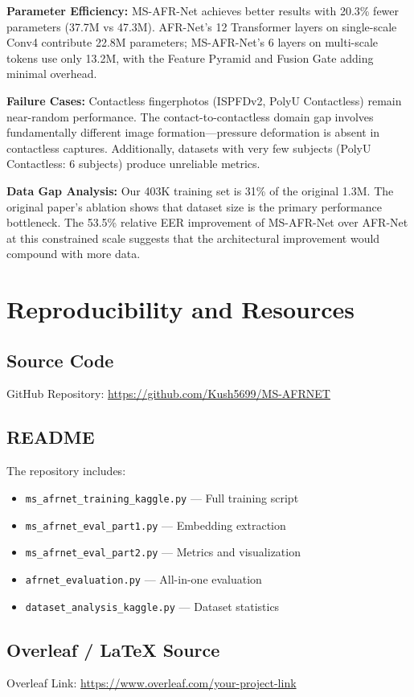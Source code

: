 \documentclass[conference]{IEEEtran}
\begin{document}
\textbf{Parameter Efficiency:} MS-AFR-Net achieves better results with 20.3\% fewer parameters (37.7M vs 47.3M). AFR-Net's 12 Transformer layers on single-scale Conv4 contribute 22.8M parameters; MS-AFR-Net's 6 layers on multi-scale tokens use only 13.2M, with the Feature Pyramid and Fusion Gate adding minimal overhead.

\textbf{Failure Cases:} Contactless fingerphotos (ISPFDv2, PolyU Contactless) remain near-random performance. The contact-to-contactless domain gap involves fundamentally different image formation---pressure deformation is absent in contactless captures. Additionally, datasets with very few subjects (PolyU Contactless: 6 subjects) produce unreliable metrics.

\textbf{Data Gap Analysis:} Our 403K training set is 31\% of the original 1.3M. The original paper's ablation shows that dataset size is the primary performance bottleneck. The 53.5\% relative EER improvement of MS-AFR-Net over AFR-Net at this constrained scale suggests that the architectural improvement would compound with more data.

\section{Reproducibility and Resources}

\subsection{Source Code}
GitHub Repository: \url{https://github.com/Kush5699/MS-AFRNET}

\subsection{README}
The repository includes:
\begin{itemize}
    \item \texttt{ms\_afrnet\_training\_kaggle.py} --- Full training script
    \item \texttt{ms\_afrnet\_eval\_part1.py} --- Embedding extraction
    \item \texttt{ms\_afrnet\_eval\_part2.py} --- Metrics and visualization
    \item \texttt{afrnet\_evaluation.py} --- All-in-one evaluation
    \item \texttt{dataset\_analysis\_kaggle.py} --- Dataset statistics
\end{itemize}

\subsection{Overleaf / LaTeX Source}
Overleaf Link: \url{https://www.overleaf.com/your-project-link}
\end{document}

